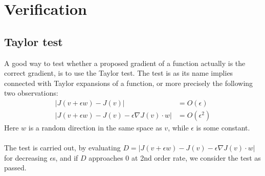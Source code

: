 \chapter{Verification}\label{Verification chapter}
\section{Taylor test}
A good way to test whether a proposed gradient of a function actually is the correct gradient, is to use the Taylor test. The test is as its name implies connected with Taylor expansions of a function, or more precisely the following two observations:
\begin{align*}
|J(v+\epsilon w)-J(v)| &= O(\epsilon) \\
|J(v+\epsilon w)-J(v)-\epsilon\nabla J(v)\cdot w| &= O(\epsilon^2)
\end{align*}
Here $w$ is a random direction in the same space as $v$, while $\epsilon$ is some constant. 
\\
\\
The test is carried out, by evaluating $D=|J(v+\epsilon w)-J(v)-\epsilon\nabla J(v)\cdot w|$ for decreasing $\epsilon$s, and if $D$ approaches 0 at 2nd order rate, we consider the test as passed.
